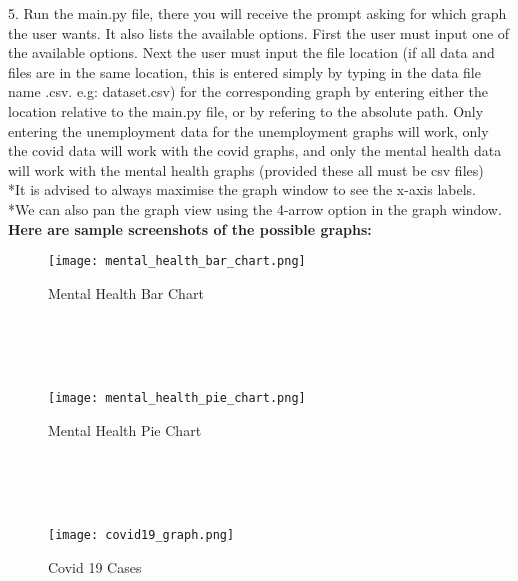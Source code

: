 \documentclass[fontsize=11pt]{article}
\begin{document}
    5. Run the main.py file, there you will receive the prompt asking for which graph the user wants. It also lists the available options. First the user must input one of the available options. Next the user must input the file location (if all data and files are in the same location, this is entered simply by typing in the data file name .csv. e.g: dataset.csv) for the corresponding graph by entering either the location relative to the main.py file, or by refering to the absolute path. Only entering the unemployment data for the unemployment graphs will work, only the covid data will work with the covid graphs, and only the mental health data will work with the mental health graphs (provided these all must be csv files)\\

    *It is advised to always maximise the graph window to see the x-axis labels.
	\\
    *We can also pan the graph view using the 4-arrow option in the graph window.\\
    
    \textbf{Here are sample screenshots of the possible graphs:}
    \begin{figure}[h]
        \texttt{[image: mental\_health\_bar\_chart.png]}
        \centering
        \caption{Mental Health Bar Chart}
        \label{fig:Figure 1}
    \end{figure}
    \phantom{---}\\
    \phantom{---}\\
	
	\phantom{---}\\
	
    \begin{figure}[h]
        \texttt{[image: mental\_health\_pie\_chart.png]}
        \centering
        \caption{Mental Health Pie Chart}
        \label{fig:Figure 2}
    \end{figure}
	
	\phantom{-}\\
	
	\phantom{---}\\
	
	\phantom{---}\\
	
   
    \begin{figure}[h]
        \texttt{[image: covid19\_graph.png]}
        \centering
        \caption{Covid 19 Cases}
        \label{fig:Figure 3}
    \end{figure}
\end{document}
